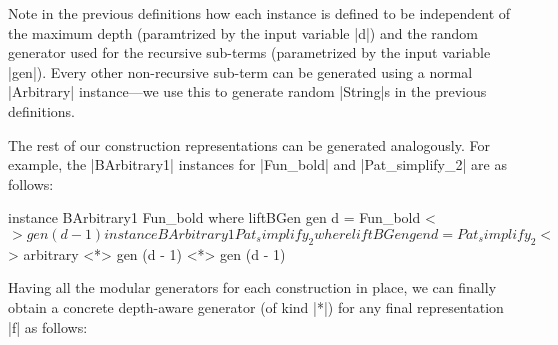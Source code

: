 Note in the previous definitions how each instance is defined to be independent
of the maximum depth (paramtrized by the input variable |d|) and the random
generator used for the recursive sub-terms (parametrized by the input variable
|gen|).
%
Every other non-recursive sub-term can be generated using a normal |Arbitrary|
instance---we use this to generate random |String|s in the previous definitions.


The rest of our construction representations can be generated analogously.
%
For example, the |BArbitrary1| instances for |Fun_bold| and |Pat_simplify_2| are
as follows:

\begin{code}
instance BArbitrary1 Fun_bold where
  liftBGen gen d = Fun_bold <$> gen (d - 1)

instance BArbitrary1 Pat_simplify_2 where
  liftBGen gen d = Pat_simplify_2  <$> arbitrary
                                   <*> gen (d - 1)
                                   <*> gen (d - 1)
\end{code} %







Having all the modular generators for each construction in place, we can finally
obtain a concrete depth-aware generator (of kind |*|) for any final
representation |f| as follows:


